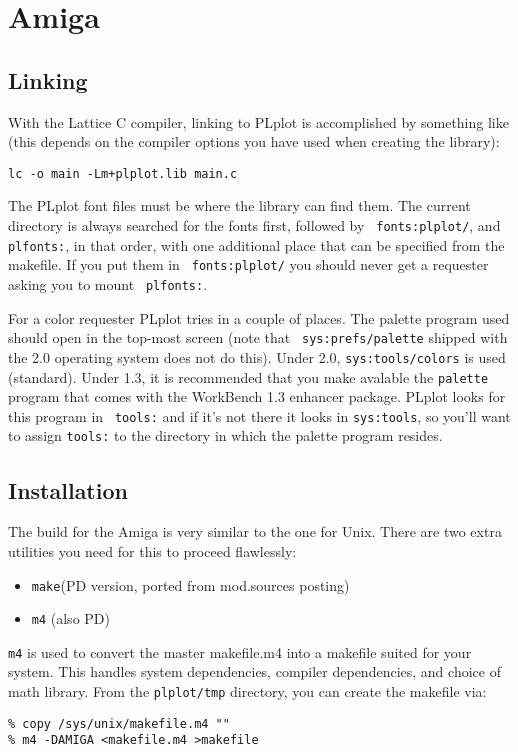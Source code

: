 \section{Amiga}

\subsection{Linking}

With the Lattice C compiler, linking to PLplot is accomplished by something
like (this depends on the compiler options you have used when creating the
library):
\begin{verbatim}
lc -o main -Lm+plplot.lib main.c
\end{verbatim}

The PLplot font files must be where the library can find them.  The current
directory is always searched for the fonts first, followed by {\tt
fonts:plplot/}, and {\tt plfonts:}, in that order, with one additional place
that can be specified from the makefile.  If you put them in {\tt
fonts:plplot/} you should never get a requester asking you to mount {\tt
plfonts:}.

For a color requester PLplot tries in a couple of places.  The palette
program used should open in the top-most screen (note that {\tt
sys:prefs/palette} shipped with the 2.0 operating system does not do this).
Under 2.0, {\tt sys:tools/colors} is used (standard).  Under 1.3, it is
recommended that you make avalable the {\tt palette} program that comes with
the WorkBench 1.3 enhancer package.  PLplot looks for this program in {\tt
tools:} and if it's not there it looks in {\tt sys:tools}, so you'll want to
assign {\tt tools:} to the directory in which the palette program resides.

\subsection{Installation}

The build for the Amiga is very similar to the one for Unix.  There are two
extra utilities you need for this to proceed flawlessly:
\begin{itemize}
\item	{\tt make}\qquad (PD version, ported from mod.sources posting)
\item	{\tt m4}  \qquad (also PD)
\end{itemize}

{\tt m4} is used to convert the master makefile.m4 into a makefile suited
for your system.  This handles system dependencies, compiler dependencies,
and choice of math library.  From the {\tt plplot/tmp} directory, you can
create the makefile via:
\begin{verbatim}
% copy /sys/unix/makefile.m4 ""
% m4 -DAMIGA <makefile.m4 >makefile
\end{verbatim}

